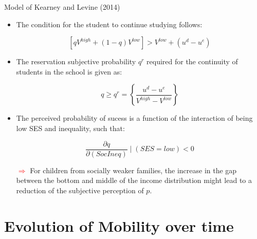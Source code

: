 \documentclass{beamer}
\begin{document}
\begin{frame}{Model of Kearney and Levine (2014)}
\begin{itemize}
\item \footnotesize The condition for the student to continue studying follows:

\begin{equation} \label{eq:Condition4} 
\left[qV^{high} + (1-q)V^{low} \right] > V^{low} + (u^d - u^e) 
\end{equation}


\item \footnotesize The reservation subjective probability $q^r$ required for the continuity of students in the school is given as:

\begin{equation} \label{eq:Condition5} 
q \geq q^r = \left \{ \frac{u^d - u^e}{V^{high} - V^{low}} \right \}
\end{equation}


\item \footnotesize The perceived probability of sucess is a function of the interaction of being low SES and inequality, such that:


\begin{equation} \label{eq:Condition7}
\frac{\partial q}{\partial (SocIneq)} \mid (SES=low) < 0
\end{equation}

\textcolor{red}{$\Longrightarrow$} For children from socially weaker families, the increase in the gap between the bottom and middle of the income distribution might lead to a reduction of the subjective perception of $p$.
\end{itemize}
\flushright \hyperlink{main3}{\beamerbutton{\textcolor{red}{Back to Presentation}}}
\end{frame}




\section{Evolution of Mobility over time}
\end{document}
